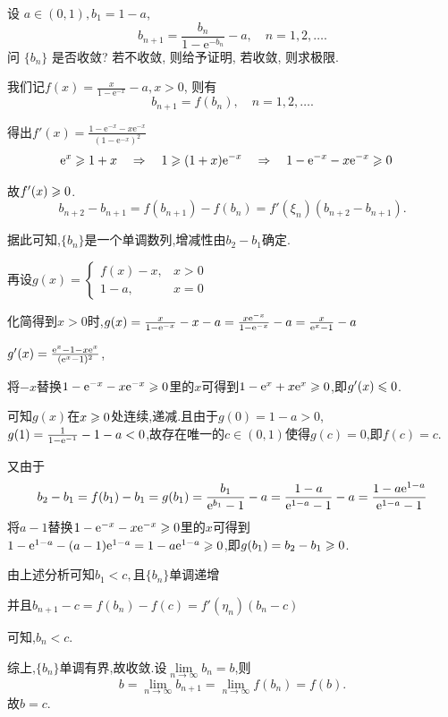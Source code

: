 \begin{exercise}[3.3.25]
    设 $a \in (0,1), b_1=1-a$,
    $$ b_{n+1} = \frac{b_n}{1-\mathrm{e}^{-b_n}} - a, \quad n=1,2,\dots. $$
    问 $\{b_n\}$ 是否收敛? 若不收敛, 则给予证明, 若收敛, 则求极限.
\end{exercise}
\begin{solution}
    我们记$f(x)=\frac{x}{1-\mathrm{e}^{-x}}-a,x>0$,
    则有$$b_{n+1}=f(b_n),\quad n=1,2,\dots. $$
    
    得出$f'(x)=\frac{1-\mathrm{e}^{-x}-x\mathrm{e}^{-x}}{(1-\mathrm{e}^{-x})^2}$
    \begin{align*}
        \mathrm{e}^{x}\geqslant 1+x\quad\Rightarrow\quad
        1\geqslant (1+x)\mathrm{e}^{-x}\quad\Rightarrow\quad
        1-\mathrm{e}^{-x}-x\mathrm{e}^{-x}&\geqslant 0
    \end{align*}

    故$f'(x)\geqslant 0$.
    $$b_{n+2}-b_{n+1}=f(b_{n+1})-f(b_n)=f'(\xi_n)\left(b_{n+2}-b_{n+1}\right).$$

    据此可知,$\{b_n\}$是一个单调数列,增减性由$b_2-b_1$确定.

    再设$g(x)=\begin{cases}
        f(x)-x,&x>0\\
        1-a,&x=0
    \end{cases}$

    化简得到$x>0$时,$g(x)=\frac{x}{1-\mathrm{e}^{-x}}-x-a=\frac{x\mathrm{e}^{-x}}{1-\mathrm{e}^{-x}}-a=\frac{x}{\mathrm{e}^x-1}-a$

    $g'(x)=\frac{\mathrm{e}^x-1-x\mathrm{e}^x}{(\mathrm{e}^x-1)^2}$,

    将$-x$替换$1-\mathrm{e}^{-x}-x\mathrm{e}^{-x}\geqslant 0$里的$x$可得到$1-\mathrm{e}^{x}+x\mathrm{e}^{x}\geqslant 0$,即$g'(x)\leqslant 0$.
    
    可知$g(x)$在$x\geqslant0$处连续,递减.且由于$g(0)=1-a>0$,$g(1)=\frac{1}{1-\mathrm{e}^{-1}}-1-a<0$,故存在唯一的$c\in(0,1)$使得$g(c)=0$,即$f(c)=c$.

    又由于
    \begin{align*}
        b_2-b_1 = f(b_1)-b_1
        = g(b_1)
        = \frac{b_1}{\mathrm{e}^{b_1}-1}-a
        = \frac{1-a}{\mathrm{e}^{1-a}-1}-a
        = \frac{1-a\mathrm{e}^{1-a}}{\mathrm{e}^{1-a}-1}
    \end{align*}
    将$a-1$替换$1-\mathrm{e}^{-x}-x\mathrm{e}^{-x}\geqslant 0$里的$x$可得到$1-\mathrm{e}^{1-a}-(a-1)\mathrm{e}^{1-a}=1-a\mathrm{e}^{1-a}\geqslant 0$,即$g(b_1)=b_2-b_1\geqslant 0$.

    由上述分析可知$b_1<c ,$且$\{b_n\}$单调递增

    并且$b_{n+1}-c=f(b_n)-f(c)=f'(\eta_n)\left(b_n-c\right)$

    可知,$b_n<c$.

    综上,$\{b_n\}$单调有界,故收敛.设$\lim\limits_{n\to\infty}b_n=b$,则
    $$b=\lim\limits_{n\to\infty}b_{n+1}=\lim\limits_{n\to\infty}f(b_n)=f(b).$$
    故$b=c$.
\end{solution}

\newpage
